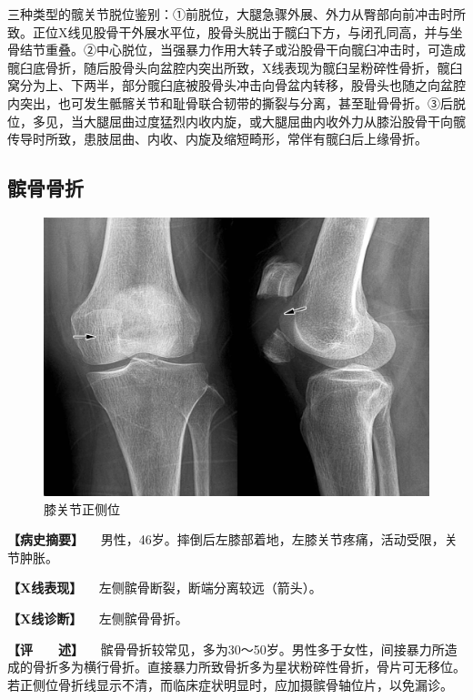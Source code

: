 三种类型的髋关节脱位鉴别：①前脱位，大腿急骤外展、外力从臀部向前冲击时所致。正位X线见股骨干外展水平位，股骨头脱出于髋臼下方，与闭孔同高，并与坐骨结节重叠。②中心脱位，当强暴力作用大转子或沿股骨干向髋臼冲击时，可造成髋臼底骨折，随后股骨头向盆腔内突出所致，X线表现为髋臼呈粉碎性骨折，髋臼窝分为上、下两半，部分髋臼底被股骨头冲击向骨盆内转移，股骨头也随之向盆腔内突出，也可发生骶髂关节和耻骨联合韧带的撕裂与分离，甚至耻骨骨折。③后脱位，多见，当大腿屈曲过度猛烈内收内旋，或大腿屈曲内收外力从膝沿股骨干向髋传导时所致，患肢屈曲、内收、内旋及缩短畸形，常伴有髋臼后上缘骨折。

\subsection{髌骨骨折}

\begin{figure}[!htbp]
 \centering
 \includegraphics{./images/Image00046.jpg}
 \captionsetup{justification=centering}
 \caption{膝关节正侧位}
 \label{fig2-3-19}
  \end{figure} 

\textbf{【病史摘要】}
　男性，46岁。摔倒后左膝部着地，左膝关节疼痛，活动受限，关节肿胀。

\textbf{【X线表现】} 　左侧髌骨断裂，断端分离较远（箭头）。

\textbf{【X线诊断】} 　左侧髌骨骨折。

\textbf{【评　　述】}
　髌骨骨折较常见，多为30～50岁。男性多于女性，间接暴力所造成的骨折多为横行骨折。直接暴力所致骨折多为星状粉碎性骨折，骨片可无移位。若正侧位骨折线显示不清，而临床症状明显时，应加摄髌骨轴位片，以免漏诊。

